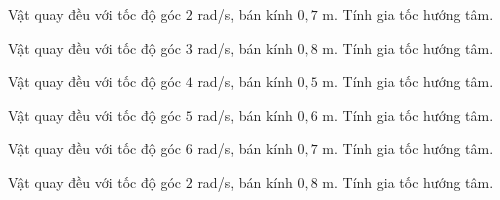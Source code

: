 \begin{ex}
Vật quay đều với tốc độ góc $2$ rad/s, bán kính $0,7$ m. Tính gia tốc hướng tâm.
\end{ex}

\begin{ex}
Vật quay đều với tốc độ góc $3$ rad/s, bán kính $0,8$ m. Tính gia tốc hướng tâm.
\end{ex}

\begin{ex}
Vật quay đều với tốc độ góc $4$ rad/s, bán kính $0,5$ m. Tính gia tốc hướng tâm.
\end{ex}

\begin{ex}
Vật quay đều với tốc độ góc $5$ rad/s, bán kính $0,6$ m. Tính gia tốc hướng tâm.
\end{ex}

\begin{ex}
Vật quay đều với tốc độ góc $6$ rad/s, bán kính $0,7$ m. Tính gia tốc hướng tâm.
\end{ex}

\begin{ex}
Vật quay đều với tốc độ góc $2$ rad/s, bán kính $0,8$ m. Tính gia tốc hướng tâm.
\end{ex}

